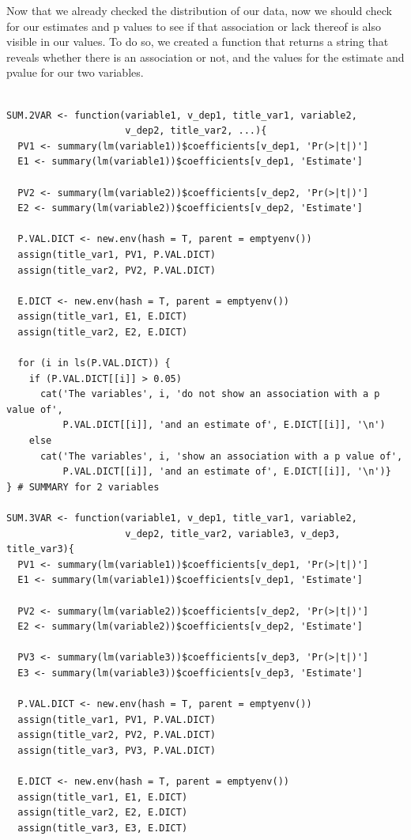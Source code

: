 \documentclass{article}
\begin{document}
Now that we already checked the distribution of our data, now we should check for our 
estimates and p values to see if that association or lack thereof is also
visible in our values. To do so, we created a function that returns a string
that reveals whether there is an association or not, and the values for the 
estimate and pvalue for our two variables.


\begin{lstlisting}

SUM.2VAR <- function(variable1, v_dep1, title_var1, variable2, 
                     v_dep2, title_var2, ...){
  PV1 <- summary(lm(variable1))$coefficients[v_dep1, 'Pr(>|t|)']
  E1 <- summary(lm(variable1))$coefficients[v_dep1, 'Estimate']
  
  PV2 <- summary(lm(variable2))$coefficients[v_dep2, 'Pr(>|t|)']
  E2 <- summary(lm(variable2))$coefficients[v_dep2, 'Estimate']
  
  P.VAL.DICT <- new.env(hash = T, parent = emptyenv())
  assign(title_var1, PV1, P.VAL.DICT)
  assign(title_var2, PV2, P.VAL.DICT)
  
  E.DICT <- new.env(hash = T, parent = emptyenv())
  assign(title_var1, E1, E.DICT)
  assign(title_var2, E2, E.DICT)
  
  for (i in ls(P.VAL.DICT)) {
    if (P.VAL.DICT[[i]] > 0.05)
      cat('The variables', i, 'do not show an association with a p value of',  
          P.VAL.DICT[[i]], 'and an estimate of', E.DICT[[i]], '\n')
    else
      cat('The variables', i, 'show an association with a p value of',  
          P.VAL.DICT[[i]], 'and an estimate of', E.DICT[[i]], '\n')}
} # SUMMARY for 2 variables

SUM.3VAR <- function(variable1, v_dep1, title_var1, variable2, 
                     v_dep2, title_var2, variable3, v_dep3, title_var3){
  PV1 <- summary(lm(variable1))$coefficients[v_dep1, 'Pr(>|t|)']
  E1 <- summary(lm(variable1))$coefficients[v_dep1, 'Estimate']
  
  PV2 <- summary(lm(variable2))$coefficients[v_dep2, 'Pr(>|t|)']
  E2 <- summary(lm(variable2))$coefficients[v_dep2, 'Estimate']
  
  PV3 <- summary(lm(variable3))$coefficients[v_dep3, 'Pr(>|t|)']
  E3 <- summary(lm(variable3))$coefficients[v_dep3, 'Estimate']
  
  P.VAL.DICT <- new.env(hash = T, parent = emptyenv())
  assign(title_var1, PV1, P.VAL.DICT)
  assign(title_var2, PV2, P.VAL.DICT)
  assign(title_var3, PV3, P.VAL.DICT)
  
  E.DICT <- new.env(hash = T, parent = emptyenv())
  assign(title_var1, E1, E.DICT)
  assign(title_var2, E2, E.DICT)
  assign(title_var3, E3, E.DICT)
  

\end{lstlisting}
\end{document}

